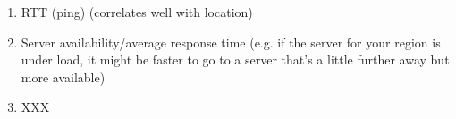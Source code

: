 \documentclass{report}
\begin{document}
\begin{problem}
\begin{answer}{24em}
\begin{enumerate}
\begin{enumerate}
    \item RTT (ping) (correlates well with location)
    \item Server availability/average response time (e.g. if the server for
          your region is under load, it might be faster to go to a server
          that's a little further away but more available)
    \item XXX
    \end{enumerate}

  \end{enumerate}
\end{answer}

\end{problem}
\end{document}
